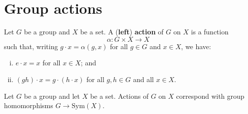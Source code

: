 \section{Group actions}

\todo{}

\begin{definition}
\label{defGroupAction}
Let $G$ be a group and $X$ be a set. A (\textbf{left}) \textbf{action} of $G$ on $X$ is a function
\[ \alpha : G \times X \to X \]
such that, writing $g \cdot x = \alpha(g,x)$ for all $g \in G$ and $x \in X$, we have:
\begin{enumerate}[(i)]
\item $e \cdot x = x$ for all $x \in X$; and
\item $(gh) \cdot x = g \cdot (h \cdot x)$ for all $g,h \in G$ and all $x \in X$.
\end{enumerate}
\end{definition}

\todo{}

\begin{theorem}
\label{thmGroupActionsHomomorphismsToSymmetricGroup}
Let $G$ be a group and let $X$ be a set. Actions of $G$ on $X$ correspond with group homomorphisms $G \to \mathrm{Sym}(X)$.
\end{theorem}

